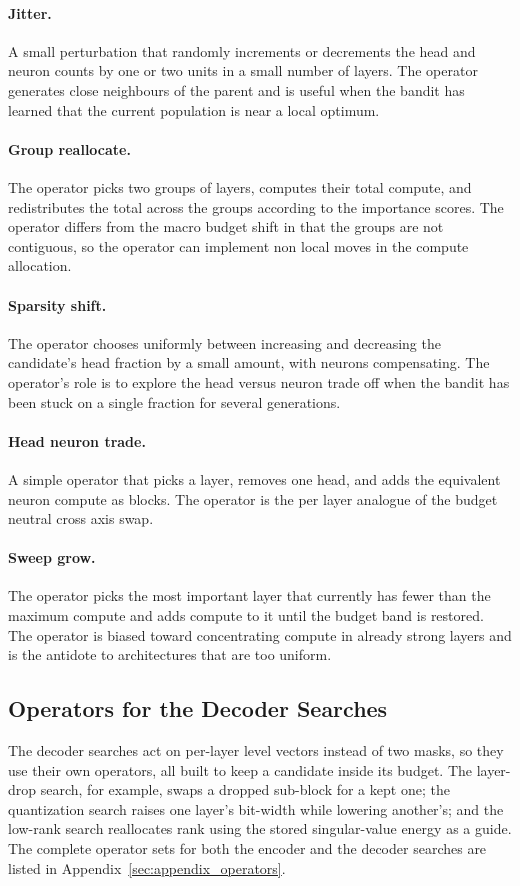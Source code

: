 \paragraph{Jitter.} A small perturbation that randomly increments or decrements the head and neuron counts by one or two units in a small number of layers. The operator generates close neighbours of the parent and is useful when the bandit has learned that the current population is near a local optimum.

\paragraph{Group reallocate.} The operator picks two groups of layers, computes their total compute, and redistributes the total across the groups according to the importance scores. The operator differs from the macro budget shift in that the groups are not contiguous, so the operator can implement non local moves in the compute allocation.

\paragraph{Sparsity shift.} The operator chooses uniformly between increasing and decreasing the candidate's head fraction by a small amount, with neurons compensating. The operator's role is to explore the head versus neuron trade off when the bandit has been stuck on a single fraction for several generations.

\paragraph{Head neuron trade.} A simple operator that picks a layer, removes one head, and adds the equivalent neuron compute as blocks. The operator is the per layer analogue of the budget neutral cross axis swap.

\paragraph{Sweep grow.} The operator picks the most important layer that currently has fewer than the maximum compute and adds compute to it until the budget band is restored. The operator is biased toward concentrating compute in already strong layers and is the antidote to architectures that are too uniform.

\subsection{Operators for the Decoder Searches}

The decoder searches act on per-layer level vectors instead of two masks, so they use their own operators, all built to keep a candidate inside its budget. The layer-drop search, for example, swaps a dropped sub-block for a kept one; the quantization search raises one layer's bit-width while lowering another's; and the low-rank search reallocates rank using the stored singular-value energy as a guide. The complete operator sets for both the encoder and the decoder searches are listed in Appendix~\ref{sec:appendix_operators}.

